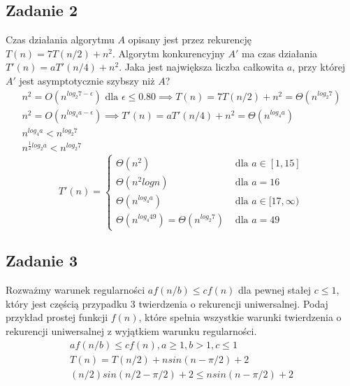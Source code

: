 \documentclass{article}
\begin{document}
\subsection*{Zadanie 2}
Czas działania algorytmu $A$ opisany jest przez rekurencję $T(n) = 7T(n/2) + n^2$.
Algorytm konkurencyjny $A'$ ma czas działania $T '(n) = aT'(n/4) + n^2$. Jaka jest największa
liczba całkowita $a$, przy której $A'$ jest asymptotycznie szybszy niż $A$?
\begin{gather*}
    n^2 = O\left(n^{log_2 7-\epsilon}\right) \text{ dla } \epsilon \leq 0.80 \implies T(n) = 7T(n/2) + n^2 = \Theta\left(n^{log_2 7}\right) \\
    n^2 = O\left(n^{log_4 a-\epsilon}\right) \implies T'(n) = aT'(n/4) + n^2 = \Theta\left(n^{log_4 a}\right) \\
    n^{log_4a} < n^{log_2 7} \\
    n^{\frac{1}{2}log_2a} < n^{log_2 7}
\end{gather*}
\begin{equation*}
    T'(n) = \begin{cases}
        \Theta\left(n^2\right)                                           & \text{ dla } a \in [1, 15]      \\
        \Theta\left(n^2logn\right)                                       & \text{ dla } a = 16             \\
        \Theta\left(n^{log_4 a}\right)                                   & \text{ dla } a \in [17, \infty) \\
        \Theta\left(n^{log_4 49}\right) = \Theta\left(n^{log_2 7}\right) & \text{ dla } a = 49
    \end{cases}
\end{equation*}

\subsection*{Zadanie 3}
Rozważmy warunek regularności $af(n/b) \leq cf(n)$ dla pewnej stałej $c \leq 1$, który jest
częścią przypadku 3 twierdzenia o rekurencji uniwersalnej. Podaj przykład prostej funkcji
$f(n)$, które spełnia wszystkie warunki twierdzenia o rekurencji uniwersalnej z wyjątkiem
warunku regularności.
\begin{gather*}
    af(n/b) \leq cf(n), a \geq 1, b > 1, c \leq 1 \\
    T(n) = T(n/2) + nsin(n - \pi/2) + 2 \\
    (n/2)sin(n/2 - \pi/2) + 2 \leq nsin(n - \pi/2) + 2
\end{gather*}
\end{document}
